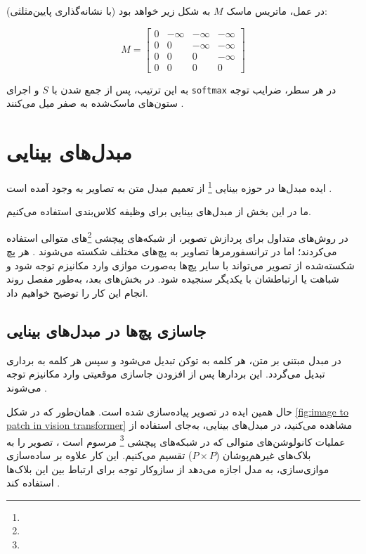 در عمل، ماتریس ماسک \( M \) به شکل زیر خواهد بود (با نشانه‌گذاری پایین‌مثلثی):

\[
M =
\begin{bmatrix}
	0 & -\infty & -\infty & -\infty \\
	0 & 0 & -\infty & -\infty \\
	0 & 0 & 0 & -\infty \\
	0 & 0 & 0 & 0
\end{bmatrix}
\]

به این ترتیب، پس از جمع شدن با \( S \) و اجرای \texttt{softmax} در هر سطر، ضرایب توجه ستون‌های ماسک‌شده به صفر میل می‌کنند \cite{vaswani2017attention}.

\section{مبدل‌های بینایی}

ایده مبدل‌ها در حوزه بینایی \footnote{} از تعمیم مبدل متن به تصاویر به وجود آمده است \cite{dosovitskiy2020image}.

ما در این بخش از مبدل‌های بینایی برای وظیفه کلاس‌بندی استفاده می‌کنیم.

در روش‌های متداول برای پردازش تصویر، از شبکه‌های پیچشی \footnote{}‌های متوالی استفاده می‌کردند؛ اما در ترانسفورمرها تصاویر به پچ‌های مختلف شکسته می‌شوند \cite{dosovitskiy2020image}. هر پچ شکسته‌شده از تصویر می‌تواند با سایر پچ‌ها به‌صورت موازی وارد مکانیزم توجه شود و شباهت یا ارتباطشان با یکدیگر سنجیده شود. در بخش‌های بعد، به‌طور مفصل روند انجام این کار را توضیح خواهیم داد.

\subsection{جاسازی پچ‌ها در مبدل‌های بینایی}
در مبدل مبتنی بر متن، هر کلمه به توکن تبدیل می‌شود و سپس هر کلمه به برداری تبدیل می‌گردد. این بردارها پس از افزودن جاسازی موقعیتی وارد مکانیزم توجه می‌شوند \cite{vaswani2017attention}.

حال همین ایده در تصویر پیاده‌سازی شده است. همان‌طور که در شکل \ref{fig:image to patch in vision transformer} مشاهده می‌کنید، در مبدل‌های بینایی، به‌جای استفاده از عملیات کانولوشن‌های متوالی که در شبکه‌های پیچشی \footnote{} مرسوم است \cite{lecun1998gradient,krizhevsky2012imagenet,he2016deep}، تصویر را به بلاک‌های غیرهم‌پوشان (\(P \times P\)) تقسیم می‌کنیم. این کار علاوه بر ساده‌سازی موازی‌سازی، به مدل اجازه می‌دهد از سازوکار توجه برای ارتباط بین این بلاک‌ها استفاده کند \cite{dosovitskiy2020image}.

